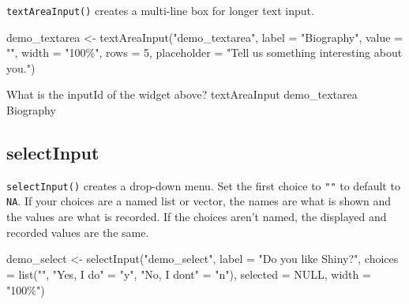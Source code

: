 \documentclass[
  oneside]{book}
\newenvironment{Shaded}{\begin{snugshade}}{\end{snugshade}}
\newcommand{\AttributeTok}[1]{\textcolor[rgb]{0.77,0.63,0.00}{#1}}
\newcommand{\ConstantTok}[1]{\textcolor[rgb]{0.00,0.00,0.00}{#1}}
\newcommand{\DecValTok}[1]{\textcolor[rgb]{0.00,0.00,0.81}{#1}}
\newcommand{\FunctionTok}[1]{\textcolor[rgb]{0.00,0.00,0.00}{#1}}
\newcommand{\NormalTok}[1]{#1}
\newcommand{\OtherTok}[1]{\textcolor[rgb]{0.56,0.35,0.01}{#1}}
\newcommand{\StringTok}[1]{\textcolor[rgb]{0.31,0.60,0.02}{#1}}
\begin{document}
\texttt{textAreaInput}\texttt{()} creates a multi-line box for longer text input.

\begin{Shaded}
\begin{Highlighting}[]
\NormalTok{demo\_textarea }\OtherTok{\textless{}{-}} 
  \FunctionTok{textAreaInput}\NormalTok{(}\StringTok{"demo\_textarea"}\NormalTok{, }
                \AttributeTok{label =} \StringTok{"Biography"}\NormalTok{, }
                \AttributeTok{value =} \StringTok{""}\NormalTok{,}
                \AttributeTok{width =} \StringTok{"100\%"}\NormalTok{,}
                \AttributeTok{rows =} \DecValTok{5}\NormalTok{, }
                \AttributeTok{placeholder =} \StringTok{"Tell us something interesting about you."}\NormalTok{)}
\end{Highlighting}
\end{Shaded}

What is the \AttributeTok{inputId} of the widget above?
textAreaInput demo\_textarea Biography

\hypertarget{selectinput}{%
\subsection{selectInput}\label{selectinput}}

\texttt{selectInput}\texttt{()} creates a drop-down menu. Set the first \AttributeTok{choice} to \texttt{""} to default to \texttt{NA}. If your choices are a named list or vector, the names are what is shown and the values are what is recorded. If the choices aren't named, the displayed and recorded values are the same.

\begin{Shaded}
\begin{Highlighting}[]
\NormalTok{demo\_select }\OtherTok{\textless{}{-}} 
  \FunctionTok{selectInput}\NormalTok{(}\StringTok{"demo\_select"}\NormalTok{, }
              \AttributeTok{label =} \StringTok{"Do you like Shiny?"}\NormalTok{, }
              \AttributeTok{choices =} \FunctionTok{list}\NormalTok{(}\StringTok{""}\NormalTok{, }
                             \StringTok{"Yes, I do"} \OtherTok{=} \StringTok{"y"}\NormalTok{, }
                             \StringTok{"No, I don\textquotesingle{}t"} \OtherTok{=} \StringTok{"n"}\NormalTok{),}
              \AttributeTok{selected =} \ConstantTok{NULL}\NormalTok{,}
              \AttributeTok{width =} \StringTok{"100\%"}\NormalTok{)}
\end{Highlighting}
\end{Shaded}
\end{document}
